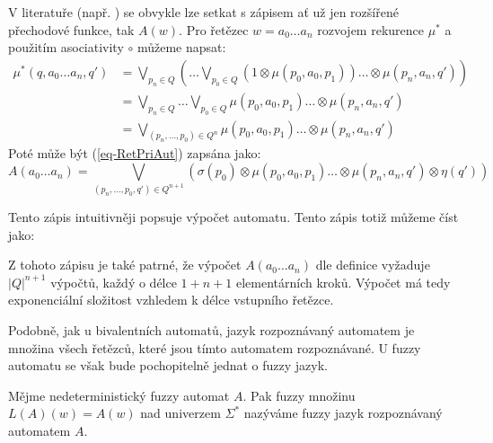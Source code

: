 \documentclass[a4paper,10pt]{article}
\begin{document}
\begin{note}
  V literatuře (např. \cite{SebJoh-InvFuzzAutInvFuzzLang} \cite{IgnCirBog-DetFuzAutMemValComResLat} \cite{Bel-DetFuzAut}) se obvykle lze setkat s  zápisem ať už jen rozšířené přechodové funkce, tak $A(w)$. Pro řetězec $w = a_0 \dots a_n$ rozvojem rekurence $\mu^*$ a použitím asociativity $\circ$ můžeme napsat:
  \begin{align*}
   \mu^*(q, a_0 \dots a_n, q') 
    &= \bigvee_{p_n \in Q} \left( \dots \bigvee_{p_0 \in Q} (1 \otimes \mu(p_0, a_0, p_1)) \dots \otimes \mu(p_n, a_n, q') \right)  \\
    &= \bigvee_{p_n \in Q} \dots \bigvee_{p_0 \in Q} \mu(p_0, a_0, p_1) \dots \otimes \mu(p_n, a_n, q') \\
    &= \bigvee_{(p_n,\dots, p_0) \in Q^n} \mu(p_0, a_0, p_1) \dots \otimes \mu(p_n, a_n, q')
  \end{align*}
  Poté může být (\ref{eq-RetPriAut}) zapsána jako:
  $$
    A(a_0 \dots a_n) = \bigvee_{(p_n,\dots, p_0, q') \in Q^{n+1}} (\sigma(p_0) \otimes \mu(p_0, a_0, p_1) \dots \otimes \mu(p_n, a_n, q') \otimes \eta(q'))
  $$
  
  Tento zápis intuitivněji popsuje výpočet automatu. Tento zápis totiž můžeme číst jako: 
  
  Z tohoto zápisu je také patrné, že výpočet $A(a_0 \dots a_n)$ dle definice vyžaduje $|Q|^{n+1}$ výpočtů, každý o délce $1 + n + 1$ elementárních kroků. Výpočet má tedy exponenciální složitost vzhledem k délce vstupního řetězce.
  
\end{note}

Podobně, jak u bivalentních automatů, jazyk rozpoznávaný automatem je množina všech řetězců, které jsou tímto automatem rozpoznávané. U fuzzy automatu se však bude pochopitelně jednat o fuzzy jazyk.

\begin{definition}\label{def-JazRozpAut}
 Mějme nedeterministický fuzzy automat $A$. Pak fuzzy množinu $L(A)(w) = A(w)$ nad univerzem $\Sigma^*$ nazýváme fuzzy jazyk rozpoznávaný automatem $A$.
\end{definition}
\end{document}
